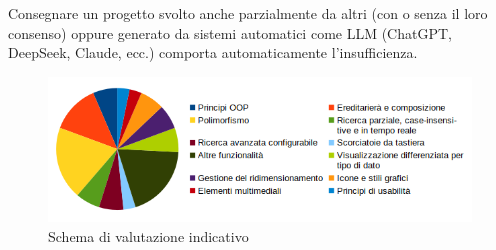 \documentclass[10pt,a4paper,oneside]{article}
\begin{document}
Consegnare un progetto svolto anche parzialmente da altri (con o senza il loro consenso) oppure generato da sistemi automatici come LLM (ChatGPT, DeepSeek, Claude, ecc.) comporta automaticamente l'insufficienza.

\begin{figure}[ht]
 \centering
 \includegraphics[width=0.95\linewidth]{assets/evaluation-criteria}
 \caption{Schema di valutazione indicativo}
 \label{fig:evaluation}
\end{figure}
\end{document}
